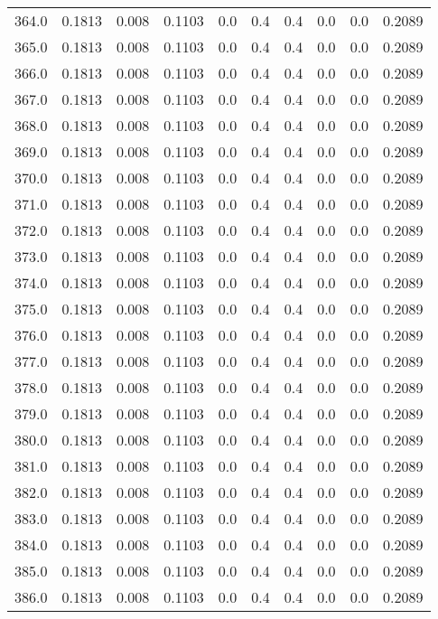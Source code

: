 \begin{longtable}{lrrrrrrrrr}
364.0 & 0.1813 & 0.008 & 0.1103 & 0.0 & 0.4 & 0.4 & 0.0 & 0.0 & 0.2089 \\
365.0 & 0.1813 & 0.008 & 0.1103 & 0.0 & 0.4 & 0.4 & 0.0 & 0.0 & 0.2089 \\
366.0 & 0.1813 & 0.008 & 0.1103 & 0.0 & 0.4 & 0.4 & 0.0 & 0.0 & 0.2089 \\
367.0 & 0.1813 & 0.008 & 0.1103 & 0.0 & 0.4 & 0.4 & 0.0 & 0.0 & 0.2089 \\
368.0 & 0.1813 & 0.008 & 0.1103 & 0.0 & 0.4 & 0.4 & 0.0 & 0.0 & 0.2089 \\
369.0 & 0.1813 & 0.008 & 0.1103 & 0.0 & 0.4 & 0.4 & 0.0 & 0.0 & 0.2089 \\
370.0 & 0.1813 & 0.008 & 0.1103 & 0.0 & 0.4 & 0.4 & 0.0 & 0.0 & 0.2089 \\
371.0 & 0.1813 & 0.008 & 0.1103 & 0.0 & 0.4 & 0.4 & 0.0 & 0.0 & 0.2089 \\
372.0 & 0.1813 & 0.008 & 0.1103 & 0.0 & 0.4 & 0.4 & 0.0 & 0.0 & 0.2089 \\
373.0 & 0.1813 & 0.008 & 0.1103 & 0.0 & 0.4 & 0.4 & 0.0 & 0.0 & 0.2089 \\
374.0 & 0.1813 & 0.008 & 0.1103 & 0.0 & 0.4 & 0.4 & 0.0 & 0.0 & 0.2089 \\
375.0 & 0.1813 & 0.008 & 0.1103 & 0.0 & 0.4 & 0.4 & 0.0 & 0.0 & 0.2089 \\
376.0 & 0.1813 & 0.008 & 0.1103 & 0.0 & 0.4 & 0.4 & 0.0 & 0.0 & 0.2089 \\
377.0 & 0.1813 & 0.008 & 0.1103 & 0.0 & 0.4 & 0.4 & 0.0 & 0.0 & 0.2089 \\
378.0 & 0.1813 & 0.008 & 0.1103 & 0.0 & 0.4 & 0.4 & 0.0 & 0.0 & 0.2089 \\
379.0 & 0.1813 & 0.008 & 0.1103 & 0.0 & 0.4 & 0.4 & 0.0 & 0.0 & 0.2089 \\
380.0 & 0.1813 & 0.008 & 0.1103 & 0.0 & 0.4 & 0.4 & 0.0 & 0.0 & 0.2089 \\
381.0 & 0.1813 & 0.008 & 0.1103 & 0.0 & 0.4 & 0.4 & 0.0 & 0.0 & 0.2089 \\
382.0 & 0.1813 & 0.008 & 0.1103 & 0.0 & 0.4 & 0.4 & 0.0 & 0.0 & 0.2089 \\
383.0 & 0.1813 & 0.008 & 0.1103 & 0.0 & 0.4 & 0.4 & 0.0 & 0.0 & 0.2089 \\
384.0 & 0.1813 & 0.008 & 0.1103 & 0.0 & 0.4 & 0.4 & 0.0 & 0.0 & 0.2089 \\
385.0 & 0.1813 & 0.008 & 0.1103 & 0.0 & 0.4 & 0.4 & 0.0 & 0.0 & 0.2089 \\
386.0 & 0.1813 & 0.008 & 0.1103 & 0.0 & 0.4 & 0.4 & 0.0 & 0.0 & 0.2089 \\

\end{longtable}
